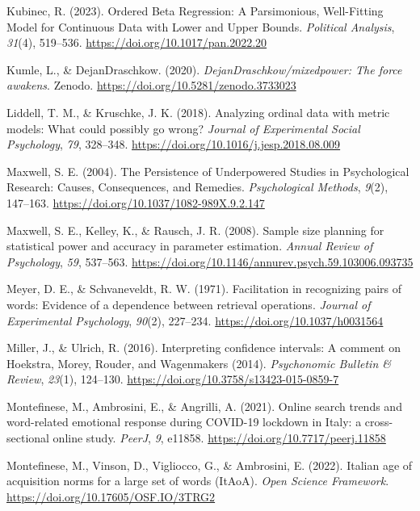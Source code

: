 \documentclass[
  man]{apa7}
\newlength{\cslhangindent}
\newenvironment{CSLReferences}[2] %
 {\begin{list}{}{%
  \setlength{\itemindent}{0pt}
  \setlength{\leftmargin}{0pt}
  \setlength{\parsep}{0pt}
  \ifodd #1
   \setlength{\leftmargin}{\cslhangindent}
   \setlength{\itemindent}{-1\cslhangindent}
  \fi
  \setlength{\itemsep}{#2\baselineskip}}}
 {\end{list}}
\begin{document}
\begin{CSLReferences}{1}{0}
Kubinec, R. (2023). Ordered Beta Regression: A Parsimonious, Well-Fitting Model for Continuous Data with Lower and Upper Bounds. \emph{Political Analysis}, \emph{31}(4), 519--536. \url{https://doi.org/10.1017/pan.2022.20}

Kumle, L., \& DejanDraschkow. (2020). \emph{DejanDraschkow/mixedpower: The force awakens}. Zenodo. \url{https://doi.org/10.5281/zenodo.3733023}

Liddell, T. M., \& Kruschke, J. K. (2018). Analyzing ordinal data with metric models: What could possibly go wrong? \emph{Journal of Experimental Social Psychology}, \emph{79}, 328--348. \url{https://doi.org/10.1016/j.jesp.2018.08.009}

Maxwell, S. E. (2004). The Persistence of Underpowered Studies in Psychological Research: Causes, Consequences, and Remedies. \emph{Psychological Methods}, \emph{9}(2), 147--163. \url{https://doi.org/10.1037/1082-989X.9.2.147}

Maxwell, S. E., Kelley, K., \& Rausch, J. R. (2008). Sample size planning for statistical power and accuracy in parameter estimation. \emph{Annual Review of Psychology}, \emph{59}, 537--563. \url{https://doi.org/10.1146/annurev.psych.59.103006.093735}

Meyer, D. E., \& Schvaneveldt, R. W. (1971). Facilitation in recognizing pairs of words: Evidence of a dependence between retrieval operations. \emph{Journal of Experimental Psychology}, \emph{90}(2), 227--234. \url{https://doi.org/10.1037/h0031564}

Miller, J., \& Ulrich, R. (2016). Interpreting confidence intervals: A comment on Hoekstra, Morey, Rouder, and Wagenmakers (2014). \emph{Psychonomic Bulletin \& Review}, \emph{23}(1), 124--130. \url{https://doi.org/10.3758/s13423-015-0859-7}

Montefinese, M., Ambrosini, E., \& Angrilli, A. (2021). Online search trends and word-related emotional response during COVID-19 lockdown in Italy: a cross-sectional online study. \emph{PeerJ}, \emph{9}, e11858. \url{https://doi.org/10.7717/peerj.11858}

Montefinese, M., Vinson, D., Vigliocco, G., \& Ambrosini, E. (2022). Italian age of acquisition norms for a large set of words (ItAoA). \emph{Open Science Framework}. \url{https://doi.org/10.17605/OSF.IO/3TRG2}


\end{CSLReferences}
\end{document}
